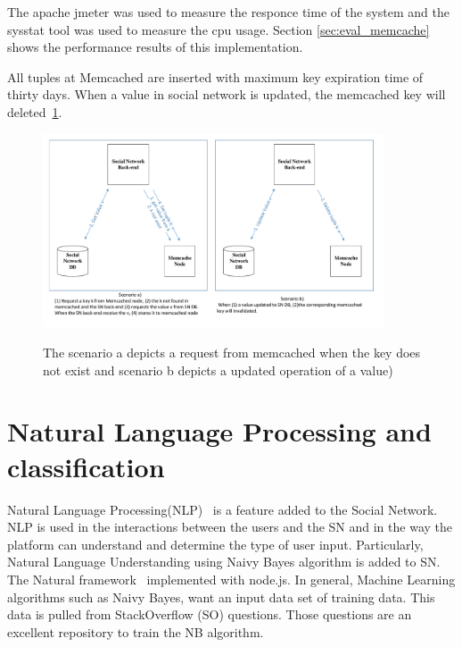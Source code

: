 The apache jmeter\cite{jmeter_url} was used to measure the responce time of the system and the sysstat tool\cite{sysstat_url} was used to measure the cpu usage. Section \ref{sec:eval_memcache} 
 shows the performance results of this implementation.

All tuples at Memcached are inserted with maximum key expiration time of thirty days. When a value in social network is updated, the memcached key will deleted~\ref{fig:memcache_key_value}.

\begin{figure}[h]
	\caption{The scenario a depicts a request from memcached when the key does not exist and scenario b depicts a updated operation of a value) }
	\includegraphics[width=0.9\textwidth]{./fig/memcached_key_value.pdf}
	\centering
	\label{fig:memcache_key_value}
\end{figure}

\section{Natural Language Processing and classification}
\label{sec:natural_implementation}
Natural Language Processing(NLP)~\cite{manning1999foundations} is a feature added to the Social Network. NLP is used in the interactions between the users and the SN and in the way the platform can understand and determine the type of user input. Particularly, Natural Language Understanding using Naivy Bayes algorithm is added to SN. The Natural framework~\cite{nodenatural_url} implemented with node.js. In general, Machine Learning algorithms such as Naivy Bayes, want an input data set of training data. This data is pulled from StackOverflow (SO) questions. Those questions are an excellent repository to train the NB algorithm.

